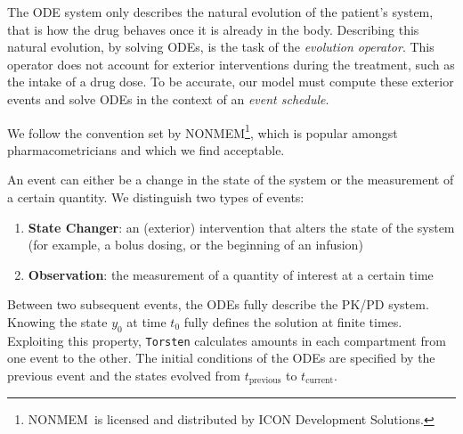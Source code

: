 \documentclass[11pt]{article}
\begin{document}
The ODE system only describes the natural evolution of the patient's system, that is 
how the drug behaves once it is already in the body. Describing this natural evolution, 
by solving ODEs, is the task of the \textit{evolution operator}. This operator does not 
account for exterior interventions during the treatment, such as the intake of a drug 
dose. To be accurate, our model must compute these exterior events and solve ODEs
in the context of an \textit{event schedule}.

We follow the convention set by NONMEM\textregistered\footnote{NONMEM\textregistered\ 
is licensed and distributed by ICON Development Solutions.}, which is popular amongst 
pharmacometricians and which we find acceptable.

An event can either be a change in the state of the system or the measurement of a certain 
quantity. We distinguish two types of events:
\begin{enumerate}
  \item \textbf{State Changer}: an (exterior) intervention that alters the state of the 
  system (for example, a bolus dosing, or the beginning of an infusion)
  \item \textbf{Observation}: the measurement of a quantity of interest at a certain time
\end{enumerate}

Between two subsequent events, the ODEs fully describe the PK/PD system. Knowing 
the state $y_0$ at time $t_0$ fully defines the solution at finite times. Exploiting this 
property, \texttt{Torsten} calculates amounts in each compartment from one event to the other.
 The initial conditions of the ODEs are specified by the previous event and the states 
 evolved from $t_\mathrm{previous}$ to $t_\mathrm{current}$.
\end{document}
